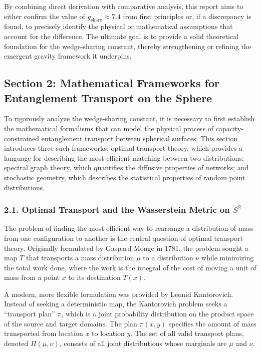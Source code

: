 \documentclass[11pt]{article}
\begin{document}
By combining direct derivation with comparative analysis, this report aims to either confirm the value of $g_{\mathrm{share}} \approx 7.4$ from first principles or, if a discrepancy is found, to precisely identify the physical or mathematical assumptions that account for the difference. The ultimate goal is to provide a solid theoretical foundation for the wedge-sharing constant, thereby strengthening or refining the emergent gravity framework it underpins.

\subsection*{Section 2: Mathematical Frameworks for Entanglement Transport on the Sphere}
To rigorously analyze the wedge-sharing constant, it is necessary to first establish the mathematical formalisms that can model the physical process of capacity-constrained entanglement transport between spherical surfaces. This section introduces three such frameworks: optimal transport theory, which provides a language for describing the most efficient matching between two distributions; spectral graph theory, which quantifies the diffusive properties of networks; and stochastic geometry, which describes the statistical properties of random point distributions.

\subsubsection*{2.1. Optimal Transport and the Wasserstein Metric on $S^2$}
The problem of finding the most efficient way to rearrange a distribution of mass from one configuration to another is the central question of optimal transport theory. Originally formulated by Gaspard Monge in 1781, the problem sought a map $T$ that transports a mass distribution $\mu$ to a distribution $\nu$ while minimizing the total work done, where the work is the integral of the cost of moving a unit of mass from a point $x$ to its destination $T(x)$.

A modern, more flexible formulation was provided by Leonid Kantorovich. Instead of seeking a deterministic map, the Kantorovich problem seeks a “transport plan” $\pi$, which is a joint probability distribution on the product space of the source and target domains. The plan $\pi(x,y)$ specifies the amount of mass transported from location $x$ to location $y$. The set of all valid transport plans, denoted $\Pi(\mu, \nu)$, consists of all joint distributions whose marginals are $\mu$ and $\nu$.
\end{document}
